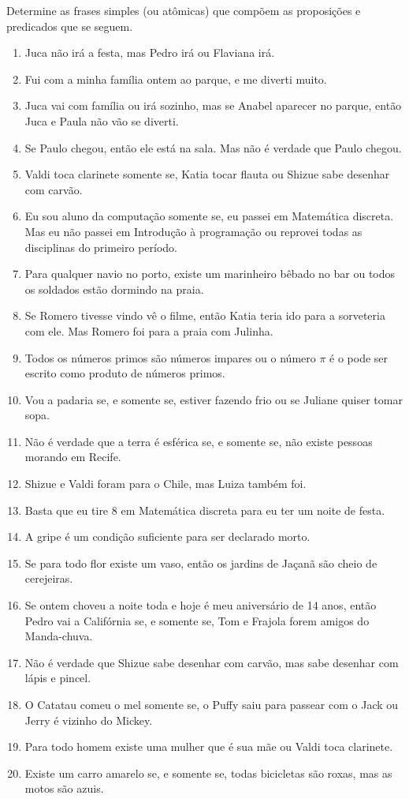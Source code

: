 \begin{problemset}
    \item Determine as frases simples (ou atômicas) que compõem as proposições e predicados que se seguem.
    \begin{enumerate}
        \item Juca não irá a festa, mas Pedro irá ou Flaviana irá.
    	\item Fui com a minha família ontem ao parque, e me diverti muito.
    	\item Juca vai com família ou irá sozinho, mas se Anabel aparecer no parque, então Juca e Paula não vão se diverti.
    	\item Se Paulo chegou, então ele está na sala. Mas não é verdade que Paulo chegou.
    	\item Valdi toca clarinete somente se, Katia tocar flauta ou Shizue sabe desenhar com carvão.
    	\item Eu sou aluno da computação somente se, eu passei em Matemática discreta. Mas eu não passei em Introdução à programação ou reprovei todas as disciplinas do primeiro período.
    	\item Para qualquer navio no porto, existe um marinheiro bêbado no bar ou todos os soldados estão dormindo na praia.
    	\item Se Romero tivesse vindo vê o filme, então Katia teria ido para a sorveteria com ele. Mas Romero foi para a praia com Julinha.
    	\item Todos os números primos são números impares ou o número $\pi$ é o pode ser escrito como produto de números primos.
    	\item Vou a padaria se, e somente se, estiver fazendo frio ou se Juliane quiser tomar sopa.
    	\item Não é verdade que a terra é esférica se, e somente se, não existe pessoas morando em Recife.
    	\item Shizue e Valdi foram para o Chile, mas Luiza também foi.
    	\item Basta que eu tire 8 em Matemática discreta para eu ter um noite de festa.
    	\item A gripe é um condição suficiente para ser declarado morto.
    	\item Se para todo flor existe um vaso, então os jardins de Jaçanã são cheio de cerejeiras. 
    	\item Se ontem choveu a noite toda e hoje é meu aniversário de 14 anos, então Pedro vai a Califórnia se, e somente se, Tom e Frajola forem amigos do Manda-chuva.
    	\item Não é verdade que Shizue sabe desenhar com carvão, mas sabe desenhar com lápis e pincel.
    	\item O Catatau comeu o mel somente se, o Puffy saiu para passear com o Jack ou Jerry é vizinho do Mickey.
    	\item Para todo homem existe uma mulher que é sua mãe ou Valdi toca clarinete.
    	\item Existe um carro amarelo se, e somente se, todas bicicletas são roxas, mas as motos são azuis. 
    \end{enumerate}
\end{problemset}